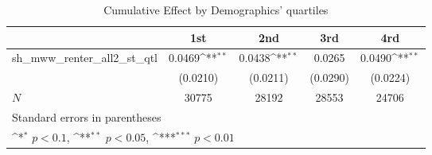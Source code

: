 \begin{table}[htbp]\centering
\def\sym#1{\ifmmode^{#1}\else\(^{#1}\)\fi}
\caption{Cumulative Effect by Demographics' quartiles}
\begin{tabular}{l*{4}{c}}
\hline\hline
            &\multicolumn{1}{c}{1st}&\multicolumn{1}{c}{2nd}&\multicolumn{1}{c}{3rd}&\multicolumn{1}{c}{4rd}\\
\hline
sh\_mww\_renter\_all2\_st\_qtl&      0.0469\sym{**} &      0.0438\sym{**} &      0.0265         &      0.0490\sym{**} \\
            &    (0.0210)         &    (0.0211)         &    (0.0290)         &    (0.0224)         \\
\hline
\(N\)       &       30775         &       28192         &       28553         &       24706         \\
\hline\hline
\multicolumn{5}{l}{\footnotesize Standard errors in parentheses}\\
\multicolumn{5}{l}{\footnotesize \sym{*} \(p<0.1\), \sym{**} \(p<0.05\), \sym{***} \(p<0.01\)}\\
\end{tabular}
\end{table}
